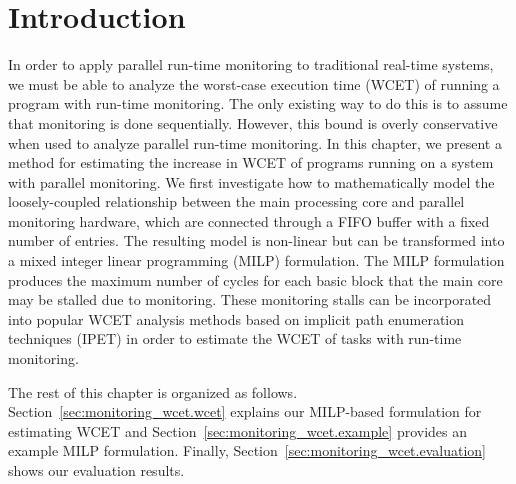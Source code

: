 \section{Introduction}
\label{sec:monitoring_wcet.introduction}

In order to apply parallel run-time monitoring to traditional real-time systems, we must
be able to analyze the worst-case execution time (WCET) of running a program
with run-time monitoring. The only existing way to do this is to assume that
monitoring is done sequentially. However, this bound is overly conservative when used to analyze parallel run-time monitoring.
In this chapter, we present a method for estimating the increase in WCET of
programs running on a system with parallel monitoring. We first investigate how
to mathematically model the loosely-coupled relationship between the main 
processing core and parallel monitoring hardware, which are connected
through a FIFO buffer with a fixed number of entries. The resulting model
is non-linear but can be transformed into a mixed integer linear programming (MILP) 
formulation.
The MILP formulation produces the maximum number of cycles for each basic block
that the main core may be stalled due to monitoring.
These monitoring stalls can be incorporated into popular
WCET analysis methods based on implicit path enumeration techniques (IPET)
\cite{li-ipet-dac95} in order to estimate the WCET of tasks with run-time monitoring.

The rest of this chapter is organized as follows.
Section~\ref{sec:monitoring_wcet.wcet} explains our MILP-based formulation for
estimating WCET and Section~\ref{sec:monitoring_wcet.example} provides an
example MILP formulation. Finally, Section~\ref{sec:monitoring_wcet.evaluation}
shows our evaluation results.


